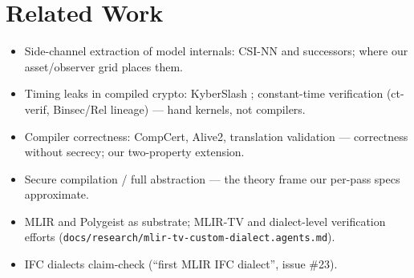 \section{Related Work}


\begin{itemize}
  \item Side-channel extraction of model internals: CSI-NN
    \cite{batina2019csinn} and successors; where our asset/observer grid
    places them.
  \item Timing leaks in compiled crypto: KyberSlash \cite{kyberslash2024};
    constant-time verification (ct-verif, Binsec/Rel lineage) --- hand
    kernels, not compilers.
  \item Compiler correctness: CompCert, Alive2, translation validation
    \cite{lopes2021alive2} --- correctness without secrecy; our two-property
    extension.
  \item Secure compilation / full abstraction --- the theory frame our
    per-pass specs approximate.
  \item MLIR \cite{lattner2021mlir} and Polygeist \cite{moses2021polygeist}
    as substrate; MLIR-TV and dialect-level verification efforts
    (\texttt{docs/research/mlir-tv-custom-dialect.agents.md}).
  \item IFC dialects claim-check (``first MLIR IFC dialect'', issue \#23).
\end{itemize}
